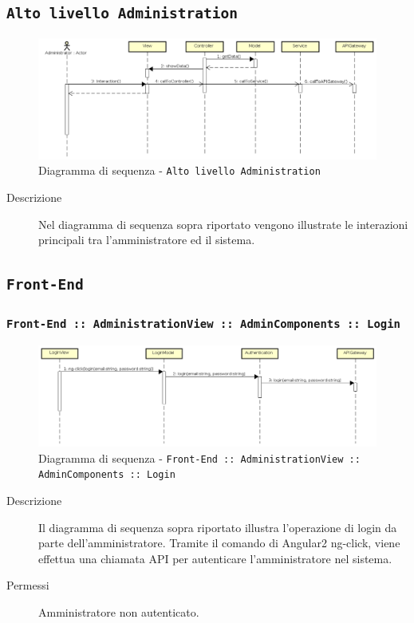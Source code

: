 \documentclass[../DefinizioneDiProdotto.tex]{subfiles}
\begin{document}
	
	\subsection{\texttt{Alto livello Administration}}
	\begin{figure}[!h]
		\centering
		\includegraphics[width=\textwidth]{DiagrammiSequenza/DiagrammaSequenzaGeneraleAdmin.png}
		\caption{Diagramma di sequenza - \texttt{Alto livello Administration }}
	\end{figure}
	\begin{description}
		\item [Descrizione] Nel diagramma di sequenza sopra riportato  vengono illustrate le interazioni principali tra l'amministratore ed il sistema.
	\end{description}

	\subsection{\texttt{Front-End}}
		\subsubsection{\texttt{Front-End :: AdministrationView :: AdminComponents :: Login}}
		\begin{figure}[!h]
			\centering
			\includegraphics[width=\textwidth]{DiagrammiSequenza/Front-End/AdministrationView/Login.png}
			\caption{Diagramma di sequenza - \texttt{Front-End :: AdministrationView :: AdminComponents :: Login} }
		\end{figure}
		\begin{description}
			\item [Descrizione] Il diagramma di sequenza sopra riportato illustra l'operazione di login da parte dell'amministratore. Tramite il comando di Angular2 ng-click, viene effettua una chiamata API per autenticare l'amministratore nel sistema.
			\item [Permessi] Amministratore non autenticato.
	\end{description}
\end{document}
